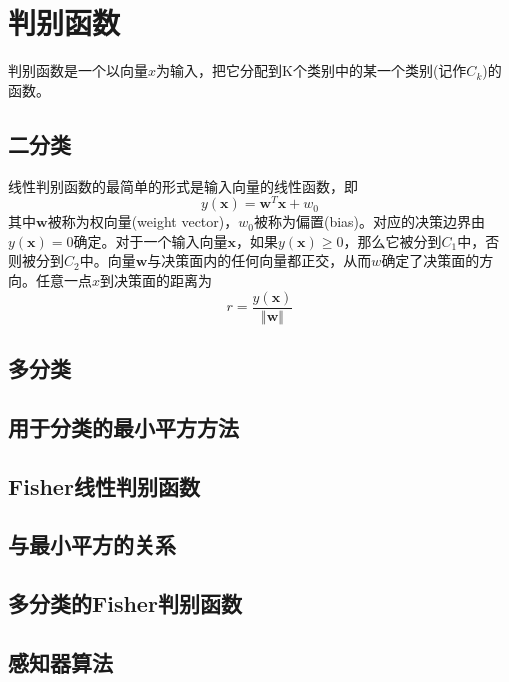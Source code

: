 \section{判别函数}
判别函数是一个以向量$x$为输入，把它分配到K个类别中的某一个类别(记作$C_k$)的函数。
\subsection*{二分类}
线性判别函数的最简单的形式是输入向量的线性函数，即
\begin{equation}
	y(\boldsymbol{x})=\boldsymbol{w}^T\boldsymbol{x}+w_0
\end{equation}
其中$\boldsymbol{w}$被称为权向量(weight vector)，$w_0$被称为偏置(bias)。对应的决策边界由$y(\boldsymbol{x})=0$确定。对于一个输入向量$\boldsymbol{x}$，如果$y(\boldsymbol{x})\geqslant 0$，那么它被分到$C_1$中，否则被分到$C_2$中。向量$\boldsymbol{w}$与决策面内的任何向量都正交，从而$w$确定了决策面的方向。任意一点$x$到决策面的距离为
\begin{equation}
	r=\frac{y(\boldsymbol{x})}{\Vert \boldsymbol{w} \Vert}
\end{equation}
\subsection*{多分类}
\subsection*{用于分类的最小平方方法}
\subsection*{Fisher线性判别函数}
\subsection*{与最小平方的关系}
\subsection*{多分类的Fisher判别函数}
\subsection*{感知器算法}